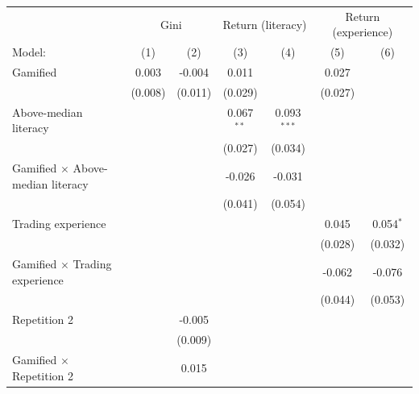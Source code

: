 \begin{tabular}{lcccccc}
   \tabularnewline \midrule \midrule
    & \multicolumn{2}{c}{Gini} & \multicolumn{2}{c}{Return (literacy)} & \multicolumn{2}{c}{Return (experience)} \\ 
   Model:                                   & (1)           & (2)           & (3)          & (4)           & (5)     & (6)\\  
   \midrule
   Gamified                                 & 0.003         & -0.004        & 0.011        &               & 0.027   &   \\   
                                            & (0.008)       & (0.011)       & (0.029)      &               & (0.027) &   \\   
   Above-median literacy                    &               &               & 0.067$^{**}$ & 0.093$^{***}$ &         &   \\   
                                            &               &               & (0.027)      & (0.034)       &         &   \\   
   Gamified $\times$ Above-median literacy  &               &               & -0.026       & -0.031        &         &   \\   
                                            &               &               & (0.041)      & (0.054)       &         &   \\   
   Trading experience                       &               &               &              &               & 0.045   & 0.054$^{*}$\\   
                                            &               &               &              &               & (0.028) & (0.032)\\   
   Gamified $\times$ Trading experience     &               &               &              &               & -0.062  & -0.076\\   
                                            &               &               &              &               & (0.044) & (0.053)\\   
   Repetition 2                             &               & -0.005        &              &               &         &   \\   
                                            &               & (0.009)       &              &               &         &   \\   
   Gamified $\times$ Repetition 2           &               & 0.015         &              &               &         &   \\   

\end{tabular}
